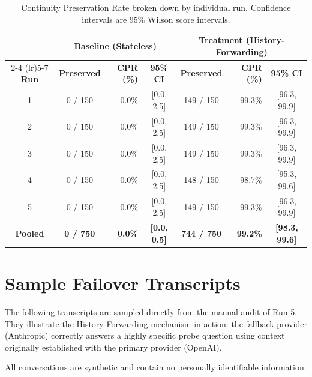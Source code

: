 \begin{table}[h]
\centering
\caption{Continuity Preservation Rate broken down by individual run. Confidence intervals are 95\% Wilson score intervals.}
\label{tab:app_cpr_runs}
\small
\begin{tabular}{ccrccrc}
\toprule
 & \multicolumn{3}{c}{\textbf{Baseline (Stateless)}} & \multicolumn{3}{c}{\textbf{Treatment (History-Forwarding)}} \\
\cmidrule(lr){2-4} \cmidrule(lr){5-7}
\textbf{Run} & \textbf{Preserved} & \textbf{CPR (\%)} & \textbf{95\% CI} & \textbf{Preserved} & \textbf{CPR (\%)} & \textbf{95\% CI} \\
\midrule
1 & 0 / 150 & 0.0\% & [0.0, 2.5] & 149 / 150 & 99.3\% & [96.3, 99.9] \\
2 & 0 / 150 & 0.0\% & [0.0, 2.5] & 149 / 150 & 99.3\% & [96.3, 99.9] \\
3 & 0 / 150 & 0.0\% & [0.0, 2.5] & 149 / 150 & 99.3\% & [96.3, 99.9] \\
4 & 0 / 150 & 0.0\% & [0.0, 2.5] & 148 / 150 & 98.7\% & [95.3, 99.6] \\
5 & 0 / 150 & 0.0\% & [0.0, 2.5] & 149 / 150 & 99.3\% & [96.3, 99.9] \\
\midrule
\textbf{Pooled} & \textbf{0 / 750} & \textbf{0.0\%} & \textbf{[0.0, 0.5]} & \textbf{744 / 750} & \textbf{99.2\%} & \textbf{[98.3, 99.6]} \\
\bottomrule
\end{tabular}
\end{table}

\section{Sample Failover Transcripts}
\label{app:transcripts}

The following transcripts are sampled directly from the manual audit of Run 5. They illustrate the History-Forwarding mechanism in action: the fallback provider (Anthropic) correctly answers a highly specific probe question using context originally established with the primary provider (OpenAI). 

All conversations are synthetic and contain no personally identifiable information.

